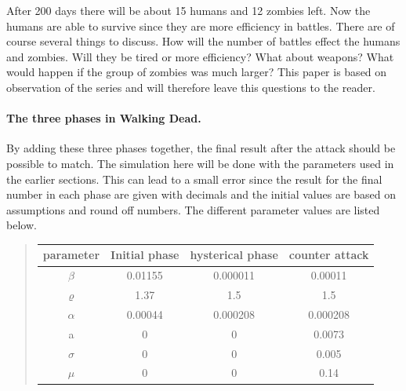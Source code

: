 \documentclass[%
twoside,                 %
final,                   %
10pt]{article}
\begin{document}
After 200 days there will be about 15 humans and 12 zombies left. Now the humans are able to survive since they are more efficiency in battles. There are of course several things to discuss. How will the number of battles effect the humans and zombies. Will they be tired or more efficiency? What about weapons? What would happen if the group of zombies was much larger? This paper is based on observation of the series and will therefore leave this questions to the reader. 

\paragraph{The three phases in Walking Dead.}
By adding these three phases together, the final result after the attack should be possible to match. The simulation here will be done with the parameters used in the earlier sections. This can lead to a small error since the result for the final number in each phase are given with decimals and the initial values are based on assumptions and round off numbers. The different parameter values are listed below. 

\begin{quote}
\begin{tabular}{cccc}
\hline
\multicolumn{1}{c}{ parameter } & \multicolumn{1}{c}{ Initial phase } & \multicolumn{1}{c}{ hysterical phase } & \multicolumn{1}{c}{ counter attack } \\
\hline
$\beta$          & 0.01155          & 0.000011         & 0.00011          \\
$\varrho$        & 1.37             & 1.5              & 1.5              \\
$\alpha$         & 0.00044          & 0.000208         & 0.000208         \\
a                & 0                & 0                & 0.0073           \\
$\sigma$         & 0                & 0                & 0.005            \\
$\mu$            & 0                & 0                & 0.14             \\
\hline
\end{tabular}
\end{quote}

\noindent
\end{document}
